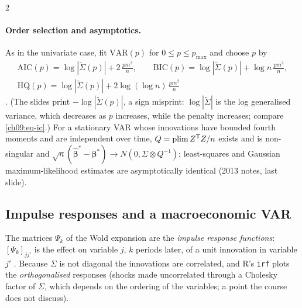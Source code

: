 \begin{paracol}{2}
\paragraph{Order selection and asymptotics.} As in the univariate case, fit $\mathrm{VAR}(p)$ for $0\le p\le p_{\max}$ and choose $p$ by
\begin{equation}\label{ch09:eq-icvar}
  \begin{gathered}
  \mathrm{AIC}(p)=\log|\tilde\Sigma(p)|+2\,\frac{pm^2}n,\qquad
  \mathrm{BIC}(p)=\log|\tilde\Sigma(p)|+\log n\,\frac{pm^2}n,\\
  \mathrm{HQ}(p)=\log|\tilde\Sigma(p)|+2\log(\log n)\,\frac{pm^2}n
  \end{gathered}
\end{equation}
. (The slides print $-\log|\tilde\Sigma(p)|$, a sign misprint: $\log|\tilde\Sigma|$ is the log
generalised variance, which decreases as $p$ increases, while the penalty increases; compare \cref{ch09:eq-ic}.) For a stationary VAR whose
innovations have bounded fourth moments and are independent over time, $Q=\mathrm{plim}\,Z^{\mathsf T} Z/n$ exists and is non-singular and
$\sqrt n(\hat{\bm\beta}^*-\bm\beta^*)\to N(0,\Sigma\otimes Q^{-1})$; least-squares and Gaussian maximum-likelihood estimates are asymptotically
identical (2013 notes, last slide).

\subsection{Impulse responses and a macroeconomic VAR}\label{ch09:sec-irf}
The matrices $\Psi_k$ of the Wold expansion are the \emph{impulse response functions}: $[\Psi_k]_{jj'}$ is the effect on variable $j$, $k$ periods
later, of a unit innovation in variable $j'$ . Because $\Sigma$ is not
diagonal the innovations are correlated, and R's \texttt{irf} plots the \emph{orthogonalised} responses (shocks made uncorrelated through a Cholesky
factor of $\Sigma$, which depends on the ordering of the variables; a point the course does not discuss).


\end{paracol}
